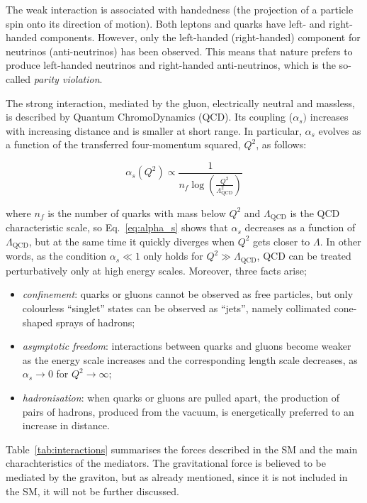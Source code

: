 			The weak interaction is associated with handedness (the projection of a particle spin onto its direction of motion). Both leptons and quarks have left- and right-handed components. However, only the left-handed (right-handed) component for neutrinos (anti-neutrinos) has been observed. This means that nature prefers to produce left-handed neutrinos and right-handed anti-neutrinos, which is the so-called \textit{parity violation}. 

			The strong interaction, mediated by the gluon, electrically neutral and massless, is described by Quantum ChromoDynamics (QCD). Its coupling ($\alpha_s)$ increases with increasing distance and is smaller at short range. In particular, $\alpha_s$ evolves as a function of the transferred four-momentum squared, $Q^2$, as follows: 

			\begin{equation}
				\label{eq:alpha_s}
				\alpha_s (Q^2) \propto \displaystyle \frac{1}{n_f \log (\frac{Q^2}{\Lambda_{\mathrm{QCD}}^2})} 
			\end{equation}

			\noindent where $n_f$ is the number of quarks with mass below $Q^2$ and $\Lambda_{\mathrm{QCD}}$ is the QCD characteristic scale, so Eq.~\ref{eq:alpha_s} shows that $\alpha_s$ decreases as a function of $\Lambda_{\mathrm{QCD}}$, but at the same time it quickly diverges when $Q^2$ gets closer to $\Lambda$. In other words, as the condition $\alpha_s \ll 1$ only holds for $Q^2 \gg \Lambda_{\mathrm{QCD}}$, QCD can be treated perturbatively only at high energy scales. Moreover, three facts arise; 

			\begin{itemize}
				\item \emph{confinement}: quarks or gluons cannot be observed as free particles, but only colourless “singlet” states can be observed as “jets”, namely collimated cone-shaped sprays of hadrons; 
				\item \emph{asymptotic freedom}: interactions between quarks and gluons become weaker as the energy scale increases and the corresponding length scale decreases, as $\alpha_s \to 0$ for $Q^2 \to \infty$;
				\item \emph{hadronisation}: when quarks or gluons are pulled apart, the production of pairs of hadrons, produced from the vacuum, is energetically preferred to an increase in distance.
			\end{itemize}

			Table~\ref{tab:interactions} summarises the forces described in the SM and the main charachteristics of the mediators. The gravitational force is believed to be mediated by the graviton, but as already mentioned, since it is not included in the SM, it will not be further discussed.

